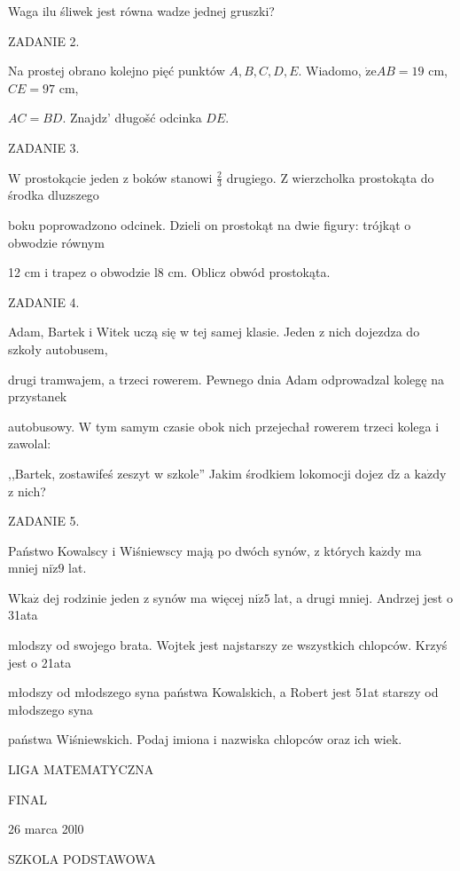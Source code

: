 \documentclass[a4paper,12pt]{article}
\begin{document}
Waga ilu śliwek jest równa wadze jednej gruszki?

ZADANIE 2.

Na prostej obrano kolejno pięć punktów $A, B, C, D, E$. Wiadomo, $\dot{\mathrm{z}}\mathrm{e}AB=19$ cm, $CE=97$ cm,

$AC=BD$. Znajdz' długošć odcinka $DE.$

ZADANIE 3.

$\mathrm{W}$ prostokącie jeden z boków stanowi $\displaystyle \frac{2}{3}$ drugiego. $\mathrm{Z}$ wierzcholka prostokąta do środka dluzszego

boku poprowadzono odcinek. Dzieli on prostokąt na dwie figury: trójkąt o obwodzie równym

12 cm i trapez o obwodzie l8 cm. Oblicz obwód prostokąta.

ZADANIE 4.

Adam, Bartek i Witek uczą się w tej samej klasie. Jeden z nich dojezdza do szkoły autobusem,

drugi tramwajem, a trzeci rowerem. Pewnego dnia Adam odprowadzal kolegę na przystanek

autobusowy. $\mathrm{W}$ tym samym czasie obok nich przejechał rowerem trzeci kolega i zawolal:

,,Bartek, zostawifeś zeszyt w szkole'' Jakim środkiem lokomocji dojez $\mathrm{d}\dot{\mathrm{z}}$ a $\mathrm{k}\mathrm{a}\dot{\mathrm{z}}\mathrm{d}\mathrm{y}$ z nich?

ZADANIE 5.

Państwo Kowalscy i Wiśniewscy mają po dwóch synów, z których $\mathrm{k}\mathrm{a}\dot{\mathrm{z}}\mathrm{d}\mathrm{y}$ ma mniej $\mathrm{n}\mathrm{i}\dot{\mathrm{z}}9$ lat.

$\mathrm{W}\mathrm{k}\mathrm{a}\dot{\mathrm{z}}$ dej rodzinie jeden z synów ma więcej $\mathrm{n}\mathrm{i}\dot{\mathrm{z}} 5$ lat, a drugi mniej. Andrzej jest o 31ata

mlodszy od swojego brata. Wojtek jest najstarszy ze wszystkich chlopców. Krzyś jest o 21ata

młodszy od młodszego syna państwa Kowalskich, a Robert jest 51at starszy od młodszego syna

państwa Wiśniewskich. Podaj imiona i nazwiska chlopców oraz ich wiek.






LIGA MATEMATYCZNA

FINAL

26 marca 20l0

SZKOLA PODSTAWOWA
\end{document}
